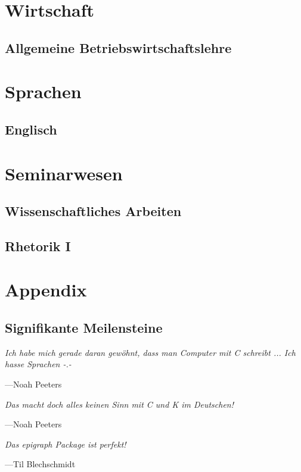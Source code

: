 \documentclass[a4paper]{report}
\begin{document}
    \part{Wirtschaft}
        \chapter{Allgemeine Betriebswirtschaftslehre}
            

    \part{Sprachen}
        \chapter{Englisch}
            

    \part{Seminarwesen}
        \chapter{Wissenschaftliches Arbeiten}
            
        \chapter{Rhetorik I}
            


    \clearpage
    \part{Appendix}

    	\clearpage
    	\printglossary[type=\acronymtype]
        \printglossary

        \clearpage
        
        

        \listoffigures

        \clearpage
        \chapter{Signifikante Meilensteine}

            \epigraph{\itshape Ich habe mich gerade daran gewöhnt, dass man Computer mit C schreibt ... Ich hasse Sprachen -.-}{---Noah Peeters}

            \epigraph{\itshape Das macht doch alles keinen Sinn mit C und K im Deutschen!}{---Noah Peeters}

            \epigraph{\itshape Das epigraph Package ist perfekt!}{---Til Blechschmidt}
\end{document}
